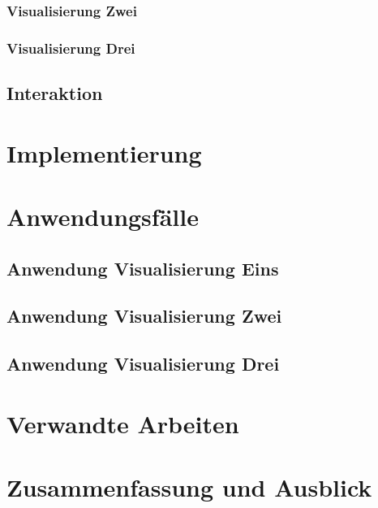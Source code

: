 \documentclass[paper=a4,12pt,titlepage,listof=totoc]{scrartcl}
\begin{document}
\subsubsection{Visualisierung Zwei}

\subsubsection{Visualisierung Drei}


\subsection{Interaktion}
\newpage

\section{Implementierung}
\newpage

\section{Anwendungsfälle}

\subsection{Anwendung Visualisierung Eins}

\subsection{Anwendung Visualisierung Zwei}

\subsection{Anwendung Visualisierung Drei}
\newpage

\section{Verwandte Arbeiten}
\newpage
\section{Zusammenfassung und Ausblick}	
\newpage




\setlength{\parskip}{0.8\baselineskip}
\cleardoublepage
{}
\printbibliography
\end{document}
